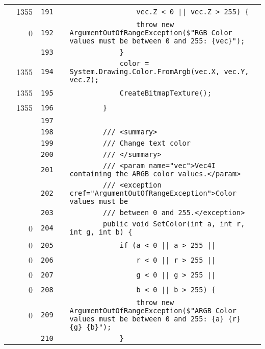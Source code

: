 \documentclass[a4paper,landscape,10pt]{article}
\begin{document}
\begin{longtable}[l]{lrrll}
\cellcolor{green} & 1355 & \verb~191~ & & \verb~                vec.Z < 0 || vec.Z > 255) {~\\
\cellcolor{red} & 0 & \verb~192~ & & \verb~                throw new ArgumentOutOfRangeException($"RGB Color values must be between 0 and 255: {vec}");~\\
\cellcolor{gray} &  & \verb~193~ & & \verb~            }~\\
\cellcolor{green} & 1355 & \verb~194~ & & \verb~            color = System.Drawing.Color.FromArgb(vec.X, vec.Y, vec.Z);~\\
\cellcolor{green} & 1355 & \verb~195~ & & \verb~            CreateBitmapTexture();~\\
\cellcolor{green} & 1355 & \verb~196~ & & \verb~        }~\\
\cellcolor{gray} &  & \verb~197~ & & \verb~~\\
\cellcolor{gray} &  & \verb~198~ & & \verb~        /// <summary>~\\
\cellcolor{gray} &  & \verb~199~ & & \verb~        /// Change text color~\\
\cellcolor{gray} &  & \verb~200~ & & \verb~        /// </summary>~\\
\cellcolor{gray} &  & \verb~201~ & & \verb~        /// <param name="vec">Vec4I containing the ARGB color values.</param>~\\
\cellcolor{gray} &  & \verb~202~ & & \verb~        /// <exception cref="ArgumentOutOfRangeException">Color values must be~\\
\cellcolor{gray} &  & \verb~203~ & & \verb~        /// between 0 and 255.</exception>~\\
\cellcolor{red} & 0 & \verb~204~ & & \verb~        public void SetColor(int a, int r, int g, int b) {~\\
\cellcolor{red} & 0 & \verb~205~ & & \verb~            if (a < 0 || a > 255 ||~\\
\cellcolor{red} & 0 & \verb~206~ & & \verb~                r < 0 || r > 255 ||~\\
\cellcolor{red} & 0 & \verb~207~ & & \verb~                g < 0 || g > 255 ||~\\
\cellcolor{red} & 0 & \verb~208~ & & \verb~                b < 0 || b > 255) {~\\
\cellcolor{red} & 0 & \verb~209~ & & \verb~                throw new ArgumentOutOfRangeException($"ARGB Color values must be between 0 and 255: {a} {r} {g} {b}");~\\
\cellcolor{gray} &  & \verb~210~ & & \verb~            }~\\

\end{longtable}
\end{document}
